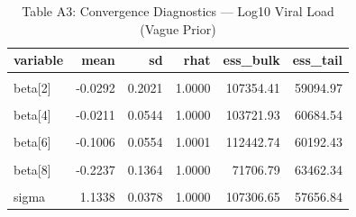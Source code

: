 \begin{table}[!h]
\centering
\caption{\label{tab:convergence-table}Table A3: Convergence Diagnostics — Log10 Viral Load (Vague Prior)}
\centering
\begin{tabular}[t]{lrrrrr}
\toprule
variable & mean & sd & rhat & ess\_bulk & ess\_tail\\
\midrule
\cellcolor{gray!10}{beta[1]} & \cellcolor{gray!10}{1.8792} & \cellcolor{gray!10}{0.1258} & \cellcolor{gray!10}{1.0001} & \cellcolor{gray!10}{56376.99} & \cellcolor{gray!10}{57153.54}\\
beta[2] & -0.0292 & 0.2021 & 1.0000 & 107354.41 & 59094.97\\
\cellcolor{gray!10}{beta[3]} & \cellcolor{gray!10}{0.4454} & \cellcolor{gray!10}{0.0545} & \cellcolor{gray!10}{1.0002} & \cellcolor{gray!10}{111825.15} & \cellcolor{gray!10}{61114.06}\\
beta[4] & -0.0211 & 0.0544 & 1.0000 & 103721.93 & 60684.54\\
\cellcolor{gray!10}{beta[5]} & \cellcolor{gray!10}{0.2375} & \cellcolor{gray!10}{0.1164} & \cellcolor{gray!10}{1.0000} & \cellcolor{gray!10}{93877.89} & \cellcolor{gray!10}{63632.59}\\
\addlinespace
beta[6] & -0.1006 & 0.0554 & 1.0001 & 112442.74 & 60192.43\\
\cellcolor{gray!10}{beta[7]} & \cellcolor{gray!10}{-0.1358} & \cellcolor{gray!10}{0.1144} & \cellcolor{gray!10}{1.0001} & \cellcolor{gray!10}{83952.39} & \cellcolor{gray!10}{62270.39}\\
beta[8] & -0.2237 & 0.1364 & 1.0000 & 71706.79 & 63462.34\\
\cellcolor{gray!10}{beta[9]} & \cellcolor{gray!10}{-0.0978} & \cellcolor{gray!10}{0.1371} & \cellcolor{gray!10}{1.0000} & \cellcolor{gray!10}{67001.23} & \cellcolor{gray!10}{63763.53}\\
sigma & 1.1338 & 0.0378 & 1.0000 & 107306.65 & 57656.84\\
\bottomrule
\end{tabular}
\end{table}
